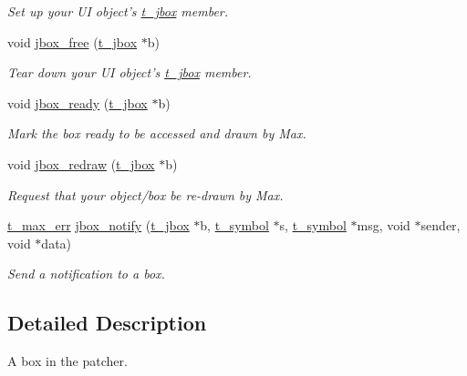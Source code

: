 \begin{DoxyCompactItemize}
\begin{DoxyCompactList}\small\item\em Set up your UI object's \hyperlink{structt__jbox}{t\_\-jbox} member. \item\end{DoxyCompactList}\item 
void \hyperlink{group__jbox_ga769cbf2dd8ebf22ac21e9df271c61704}{jbox\_\-free} (\hyperlink{structt__jbox}{t\_\-jbox} $\ast$b)
\begin{DoxyCompactList}\small\item\em Tear down your UI object's \hyperlink{structt__jbox}{t\_\-jbox} member. \item\end{DoxyCompactList}\item 
void \hyperlink{group__jbox_gabea75e4d5243003070cb2de04b81d3d1}{jbox\_\-ready} (\hyperlink{structt__jbox}{t\_\-jbox} $\ast$b)
\begin{DoxyCompactList}\small\item\em Mark the box ready to be accessed and drawn by Max. \item\end{DoxyCompactList}\item 
void \hyperlink{group__jbox_ga92b553f8adc9994553590bbbcfd7e49d}{jbox\_\-redraw} (\hyperlink{structt__jbox}{t\_\-jbox} $\ast$b)
\begin{DoxyCompactList}\small\item\em Request that your object/box be re-\/drawn by Max. \item\end{DoxyCompactList}\item 
\hyperlink{group__datatypes_ga73edaae82b318855cc09fac994918165}{t\_\-max\_\-err} \hyperlink{group__jbox_ga9aa791abf47ea1cb276c5a867665a52a}{jbox\_\-notify} (\hyperlink{structt__jbox}{t\_\-jbox} $\ast$b, \hyperlink{structt__symbol}{t\_\-symbol} $\ast$s, \hyperlink{structt__symbol}{t\_\-symbol} $\ast$msg, void $\ast$sender, void $\ast$data)
\begin{DoxyCompactList}\small\item\em Send a notification to a box. \item\end{DoxyCompactList}\end{DoxyCompactItemize}


\subsection{Detailed Description}
A box in the patcher. 

